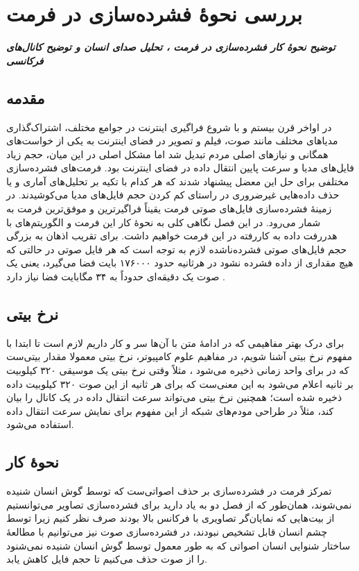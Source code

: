 \chapter{بررسی نحوهٔ فشرده‌سازی در فرمت }
\noindent
\textbf{
	\textit{
        توضیح نحوهٔ کار فشرده‌سازی در فرمت ،
        تحلیل صدای انسان و توضیح کانال‌های فرکانسی
	}
}
\pagebreak

\section{ مقدمه}
در اواخر قرن بیستم و با شروع فراگیری اینترنت در جوامع مختلف، اشتراک‌گذاری 
مدیا‌های مختلف مانند صوت، فیلم و تصویر در فضای اینترنت به یکی از خواست‌های همگانی و نیازهای اصلی مردم تبدیل شد اما 
مشکل اصلی در این میان، حجم زیاد فایل‌های مدیا و سرعت پایین انتقال داده در فضای اینترنت بود.
فرمت‌های فشرده‌سازی مختلفی برای حل این معضل پیشنهاد شدند که هر کدام با تکیه بر
تحلیل‌های آماری و یا حذف داده‌هایی غیرضروری در راستای کم کردن حجم فایل‌های مدیا می‌کوشیدند. در زمینهٔ  فشرده‌سازی فایل‌های
صوتی فرمت  یقیناً فراگیرترین و موفق‌ترین فرمت به شمار می‌رود. در این فصل 
نگاهی کلی به نحوهٔ کار این فرمت و الگوریتم‌های با هدررفت داده به کاررفته در این فرمت خواهیم داشت. برای تقریب اذهان به بزرگی حجم فایل‌های صوتی فشرده‌ناشده لازم به توجه است که هر
فایل صوتی در حالتی که هیچ مقداری از داده فشرده نشود در هرثانیه حدود ۱۷۶۰۰۰ بایت فضا می‌گیرد، یعنی یک صوت
یک دقیقه‌ای حدوداً به ۳۴ مگابایت فضا نیاز دارد \cite{uncompressed_source}.

\section{نرخ بیتی } 
برای درک بهتر مفاهیمی که در ادامهٔ متن با آن‌ها سر و کار داریم لازم است تا ابتدا با مفهوم نرخ بیتی  آشنا شویم، در مفاهیم علوم کامپیوتر، نرخ بیتی
معمولا  مقدار بیتی‌ست که در برای واحد زمانی ذخیره می‌شود \cite{bitrate_definition}، مثلاً وقتی نرخ بیتی یک موسیقی 
۳۲۰ کیلوبیت بر ثانیه
اعلام می‌شود به این معنی‌ست که برای هر ثانیه از این صوت ۳۲۰ کیلوبیت داده ذخیره شده است؛ همچنین نرخ بیتی می‌تواند سرعت انتقال داده در یک
کانال را بیان کند،‌ مثلاً در طراحی مودم‌های شبکه از این مفهوم برای نمایش سرعت انتقال داده استفاده می‌شود. 

\section{نحوهٔ کار }
تمرکز فرمت  در فشرده‌سازی 
بر حذف اصواتی‌ست که توسط گوش انسان شنیده نمی‌شوند،‌ همان‌طور که از فصل دو به یاد دارید برای فشرده‌سازی تصاویر می‌توانستیم از بیت‌هایی که 
نمایان‌گر تصاویری با فرکانس بالا بودند صرف نظر کنیم زیرا توسط چشم انسان قابل تشخیص نبودند،‌ در فشرده‌سازی صوت نیز می‌توانیم 
 با مطالعهٔ ساختار شنوایی انسان اصواتی که به طور معمول توسط گوش انسان شنیده نمی‌شنود را از صوت حذف می‌کنیم تا حجم فایل کاهش یابد.

